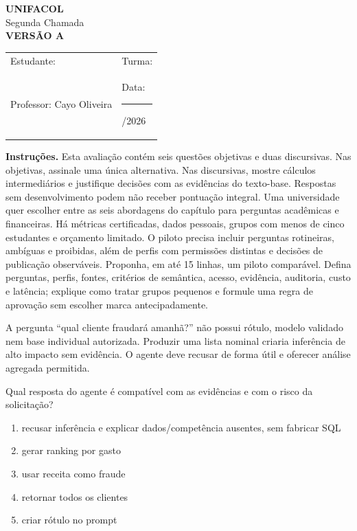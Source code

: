 \documentclass[12pt,a4paper]{article}
\begin{document}
\begin{center}
{\Large\bfseries UNIFACOL}\\[2mm]
{\large Segunda Chamada}\\[1mm]
{\Large\bfseries VERSÃO A}
\end{center}
\begin{DocumentBox}[Identificação]
\begin{tabularx}{\textwidth}{@{}p{}p{}@{}}
Estudante: \hrulefill & Turma: \hrulefill\\[3mm]
Professor: Cayo Oliveira & Data: \rule{2.7cm}{.2pt}/2026
\end{tabularx}
\end{DocumentBox}
\textbf{Instruções.} Esta avaliação contém seis questões objetivas e duas discursivas. Nas objetivas, assinale uma única alternativa. Nas discursivas, mostre cálculos intermediários e justifique decisões com as evidências do texto-base. Respostas sem desenvolvimento podem não receber pontuação integral.
\bigskip
\TextoBase
Uma universidade quer escolher entre as seis abordagens do capítulo para perguntas acadêmicas e financeiras. Há métricas certificadas, dados pessoais, grupos com menos de cinco estudantes e orçamento limitado.
O piloto precisa incluir perguntas rotineiras, ambíguas e proibidas, além de perfis com permissões distintas e decisões de publicação observáveis.
\FonteDidatica
\Comando Proponha, em até 15 linhas, um piloto comparável. Defina perguntas, perfis, fontes, critérios de semântica, acesso, evidência, auditoria, custo e latência; explique como tratar grupos pequenos e formule uma regra de aprovação sem escolher marca antecipadamente.
\EspacoDiscursiva


\TextoBase

A pergunta ``qual cliente fraudará amanhã?'' não possui rótulo, modelo validado nem base individual autorizada. Produzir uma lista nominal criaria inferência de alto impacto sem evidência. O agente deve recusar de forma útil e oferecer análise agregada permitida.

\FonteDidatica

\Comando Qual resposta do agente é compatível com as evidências e com o risco da solicitação?

\begin{enumerate}[label=\Alph*)]
  \item recusar inferência e explicar dados/competência ausentes, sem fabricar SQL
  \item gerar ranking por gasto
  \item usar receita como fraude
  \item retornar todos os clientes
  \item criar rótulo no prompt
\end{enumerate}
\end{document}
